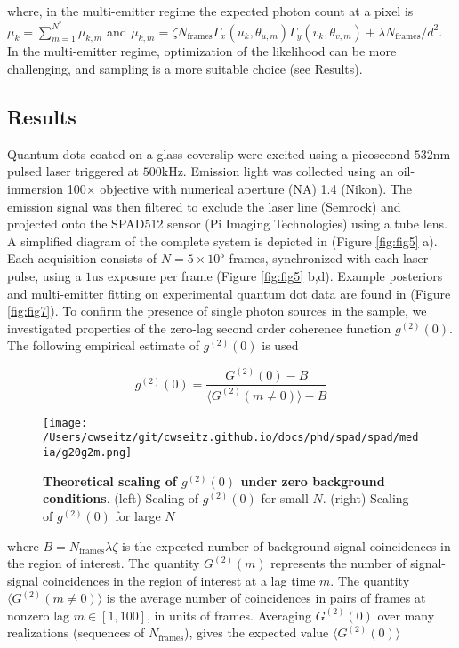 where, in the multi-emitter regime the expected photon count at a pixel is $\mu_{k} = \sum_{m=1}^{N^{*}} \mu_{k,m}$ and $\mu_{k,m}=\zeta N_{\mathrm{frames}}\Gamma_{x}(u_k,\theta_{u,m})\Gamma_{y}(v_k,\theta_{v,m}) + \lambda N_{\mathrm{frames}}/d^{2}$. In the multi-emitter regime, optimization of the likelihood can be more challenging, and sampling is a more suitable choice (see Results). 


\subsection{Results}

Quantum dots coated on a glass coverslip were excited using a picosecond $532\mathrm{nm}$ pulsed laser triggered at $500\mathrm{kHz}$. Emission light was collected using an oil-immersion 100$\times$ objective with numerical aperture (NA) 1.4 (Nikon). The emission signal was then filtered to exclude the laser line (Semrock) and projected onto the SPAD512 sensor (Pi Imaging Technologies) using a tube lens. A simplified diagram of the complete system is depicted in (Figure \ref{fig:fig5} a). Each acquisition consists of $N=5\times 10^{5}$ frames, synchronized with each laser pulse, using a $1\mathrm{us}$ exposure per frame (Figure \ref{fig:fig5} b,d). Example posteriors and multi-emitter fitting on experimental quantum dot data are found in (Figure \ref{fig:fig7}). To confirm the presence of single photon sources in the sample, we investigated properties of the zero-lag second order coherence function $g^{(2)}(0)$. The following empirical estimate of $g^{(2)}(0)$ is used \parencite{Israel2017}

\begin{equation}
g^{(2)}(0) = \frac{G^{(2)}(0)-B}{\langle G^{(2)}(m\neq 0)\rangle -B}
\end{equation}

\begin{figure}[t]
\centering
\texttt{[image: /Users/cwseitz/git/cwseitz.github.io/docs/phd/spad/spad/media/g20g2m.png]}
\caption{\textbf{Theoretical scaling of $g^{(2)}(0)$ under zero background conditions}. (left) Scaling of $g^{(2)}(0)$ for small $N$. (right) Scaling of $g^{(2)}(0)$ for large $N$}
\label{fig:fig8}
\end{figure}   

where $B = N_{\mathrm{frames}}\lambda\zeta$ is the expected number of background-signal coincidences in the region of interest. The quantity $G^{(2)}(m)$ represents the number of signal-signal coincidences in the region of interest at a lag time $m$. The quantity $\langle G^{(2)}(m\neq 0)\rangle$ is the average number of coincidences in pairs of frames at nonzero lag $m \in [1,100]$, in units of frames. Averaging $G^{(2)}(0)$ over many realizations (sequences of $N_{\mathrm{frames}}$), gives the expected value $\langle G^{(2)}(0)\rangle $

